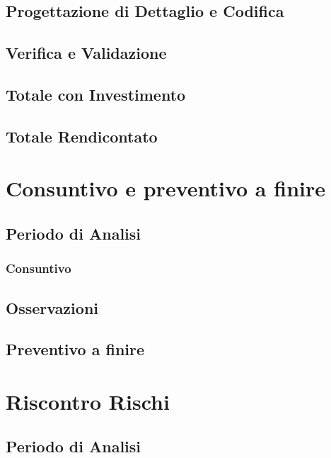 \documentclass[a4paper, oneside, openany, dvipsnames, table]{article}
\begin{document}
	\subsection{Progettazione di Dettaglio e Codifica}
	    
	\newpage
	\subsection{Verifica e Validazione}
	    
	\newpage
	\subsection{Totale con Investimento}
	    
	\newpage
	\subsection{Totale Rendicontato}
	    	
\newpage
\section{Consuntivo e preventivo a finire}
	
	\subsection{Periodo di Analisi}
		
		\subsubsection{Consuntivo}
			
		\subsection{Osservazioni}
			
	\subsection{Preventivo a finire}
		
		
\appendix
{}

\newpage
\section{Riscontro Rischi}
	\label{app:riscontro}
	
	\subsection{Periodo di Analisi}
			
\end{document}
